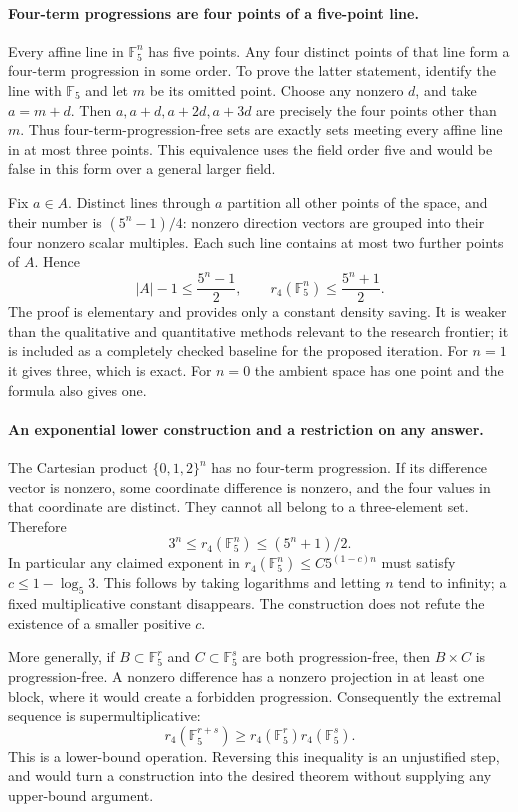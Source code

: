 \documentclass[11pt,a4paper]{article}
\newcommand{\F}{\mathbb{F}}
\begin{document}
\paragraph{Four-term progressions are four points of a five-point line.}
Every affine line in $\F_5^n$ has five points. Any four distinct points of that line form a four-term progression in some order. To prove the latter statement, identify the line with $\F_5$ and let $m$ be its omitted point. Choose any nonzero $d$, and take $a=m+d$. Then $a,a+d,a+2d,a+3d$ are precisely the four points other than $m$. Thus four-term-progression-free sets are exactly sets meeting every affine line in at most three points. This equivalence uses the field order five and would be false in this form over a general larger field.

Fix $a\in A$. Distinct lines through $a$ partition all other points of the space, and their number is $(5^n-1)/4$: nonzero direction vectors are grouped into their four nonzero scalar multiples. Each such line contains at most two further points of $A$. Hence
\[
 |A|-1\leq\frac{5^n-1}{2},\qquad
 r_4(\F_5^n)\leq\frac{5^n+1}{2}.
\]
The proof is elementary and provides only a constant density saving. It is weaker than the qualitative and quantitative methods relevant to the research frontier; it is included as a completely checked baseline for the proposed iteration. For $n=1$ it gives three, which is exact. For $n=0$ the ambient space has one point and the formula also gives one.

\paragraph{An exponential lower construction and a restriction on any answer.}
The Cartesian product $\{0,1,2\}^n$ has no four-term progression. If its difference vector is nonzero, some coordinate difference is nonzero, and the four values in that coordinate are distinct. They cannot all belong to a three-element set. Therefore
\[
 3^n\leq r_4(\F_5^n)\leq (5^n+1)/2.
\]
In particular any claimed exponent in $r_4(\F_5^n)\leq C5^{(1-c)n}$ must satisfy $c\leq1-\log_5 3$. This follows by taking logarithms and letting $n$ tend to infinity; a fixed multiplicative constant disappears. The construction does not refute the existence of a smaller positive $c$.

More generally, if $B\subset\F_5^r$ and $C\subset\F_5^s$ are both progression-free, then $B\times C$ is progression-free. A nonzero difference has a nonzero projection in at least one block, where it would create a forbidden progression. Consequently the extremal sequence is supermultiplicative:
\[
 r_4(\F_5^{r+s})\geq r_4(\F_5^r)r_4(\F_5^s).
\]
This is a lower-bound operation. Reversing this inequality is an unjustified step, and would turn a construction into the desired theorem without supplying any upper-bound argument.
\end{document}
